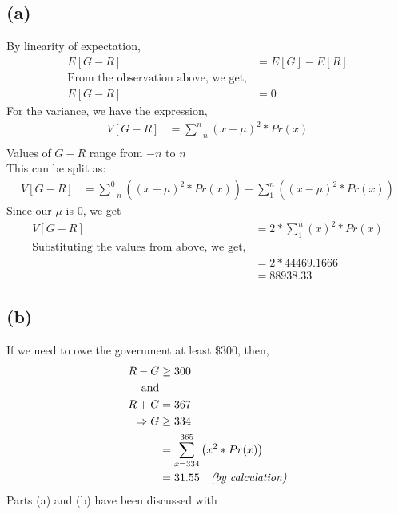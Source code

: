 \documentclass[11pt]{article}
\begin{document}
\subsection*{(a)}
By linearity of expectation, 
\begin{equation*}
\begin{split}
E[G-R] &= E[G] - E[R]\\
\text{From the observation above, we get,}\\
E[G-R]&=0
\end{split}
\end{equation*}
For the variance, we have the expression,
\begin{equation*}
\begin{split}
V[G-R] &= \sum_{-n}^n (x-\mu)^2*Pr(x)\\
\end{split}
\end{equation*}
Values of $G-R$ range from $-n$ to $n$\\
This can be split as:
\begin{equation*}
\begin{split}
V[G-R] &= \sum_{-n}^0\left((x-\mu)^2*Pr(x)\right) + \sum_{1}^n \left((x-\mu)^2*Pr(x)\right)
\end{split}
\end{equation*}
Since our $\mu$ is 0, we get
\begin{equation*}
\begin{split}
V[G-R] &= 2*\sum_{1}^n (x)^2*Pr(x)\\
\text{Substituting the values from above, we get,}\\
&=2* 44469.1666\\
&=88938.33
\end{split}
\end{equation*}
\subsection*{(b)}
If we need to owe the government at least \$300, then,
\begin{equation*}
\begin{split}
R-G &\geq 300 \\
\text{and}\\
R + G &= 367\\
\Rightarrow G & \geq 334\\
&= \sum_{x=334}^{365}\left(x^2*Pr(x)\right)\\
&= 31.55 \quad \text{\emph{(by calculation)}}
\end{split}
\end{equation*}
Parts (a) and (b) have been discussed with \cite{moiz}
\end{document}
